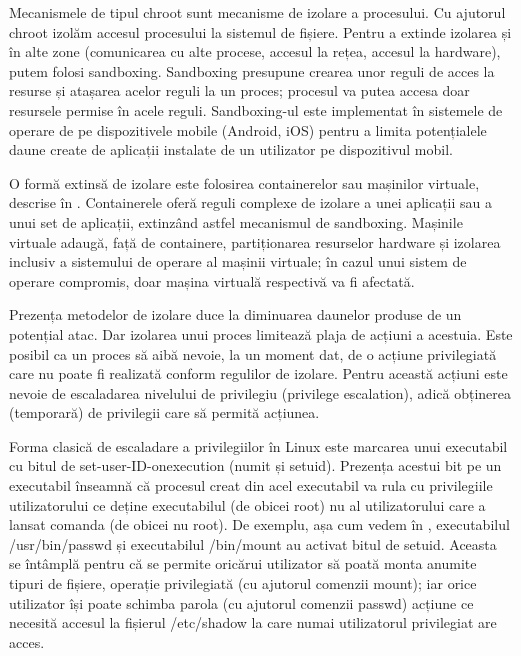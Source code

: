 Mecanismele de tipul chroot sunt mecanisme de izolare a procesului. Cu ajutorul chroot izolăm accesul procesului la sistemul de fișiere. Pentru a extinde izolarea și în alte zone (comunicarea cu alte procese, accesul la rețea, accesul la hardware), putem folosi sandboxing. Sandboxing presupune crearea unor reguli de acces la resurse și atașarea acelor reguli la un proces; procesul va putea accesa doar resursele permise în acele reguli. Sandboxing-ul este implementat în sistemele de operare de pe dispozitivele mobile (Android, iOS) pentru a limita potențialele daune create de aplicații instalate de un utilizator pe dispozitivul mobil.

O formă extinsă de izolare este folosirea containerelor sau mașinilor virtuale, descrise în . Containerele oferă reguli complexe de izolare a unei aplicații sau a unui set de aplicații, extinzând astfel mecanismul de sandboxing. Mașinile virtuale adaugă, față de containere, partiționarea resurselor hardware și izolarea inclusiv a sistemului de operare al mașinii virtuale; în cazul unui sistem de operare compromis, doar mașina virtuală respectivă va fi afectată.

Prezența metodelor de izolare duce la diminuarea daunelor produse de un potențial atac. Dar izolarea unui proces limitează plaja de acțiuni a acestuia. Este posibil ca un proces să aibă nevoie, la un moment dat, de o acțiune privilegiată care nu poate fi realizată conform regulilor de izolare. Pentru această acțiuni este nevoie de escaladarea nivelului de privilegiu (privilege escalation), adică obținerea (temporară) de privilegii care să permită acțiunea.

Forma clasică de escaladare a privilegiilor în Linux este marcarea unui executabil cu bitul de set-user-ID-onexecution (numit și setuid). Prezența acestui bit pe un executabil înseamnă că procesul creat din acel executabil va rula cu privilegiile utilizatorului ce deține executabilul (de obicei root) nu al utilizatorului care a lansat comanda (de obicei nu root). De exemplu, așa cum vedem în , executabilul /usr/bin/passwd și executabilul /bin/mount au activat bitul de setuid. Aceasta se întâmplă pentru că se permite oricărui utilizator să poată monta anumite tipuri de fișiere, operație privilegiată (cu ajutorul comenzii mount); iar orice utilizator își poate schimba parola (cu ajutorul comenzii passwd) acțiune ce necesită accesul la fișierul /etc/shadow la care numai utilizatorul privilegiat are acces.

